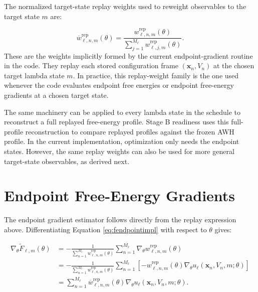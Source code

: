 The normalized target-state replay weights used to reweight observables to the target state $m$ are:

\begin{equation}
    \overline{w}^{\mathrm{rep}}_{\ell,n,m}(\theta)
    =
    \frac{
        w^{\mathrm{rep}}_{\ell,n,m}(\theta)
    }{
        \sum_{j=1}^{M_\ell}
        w^{\mathrm{rep}}_{\ell,j,m}(\theta)
    }.
    \label{eq:omegam}
\end{equation}
%
These are the weights implicitly formed by the current endpoint-gradient routine in the code. They replay each stored configuration frame $(\mathbf{x}_n, V_n)$ at the chosen target lambda state $m$. In practice, this replay-weight family is the one used whenever the code evaluates endpoint free energies or endpoint free-energy gradients at a chosen target state.

The same machinery can be applied to every lambda state in the schedule to reconstruct a full replayed free-energy profile. Stage B readiness uses this full-profile reconstruction to compare replayed profiles against the frozen AWH profile. In the current implementation, optimization only needs the endpoint states. However, the same replay weights can also be used for more general target-state observables, as derived next.

\section{Endpoint Free-Energy Gradients}

The endpoint gradient estimator follows directly from the replay expression above. Differentiating Equation \eqref{eq:fendpointimpl} with respect to $\theta$ gives:

\begin{align}
    \nabla_\theta \widetilde{F}_{\ell,m}(\theta)
    &=
    -\frac{1}{
        \sum_{n=1}^{M_\ell} w^{\mathrm{rep}}_{\ell,n,m}(\theta)
    }
    \sum_{n=1}^{M_\ell}
    \nabla_\theta w^{\mathrm{rep}}_{\ell,n,m}(\theta)
    \nonumber \\
    &=
    -\frac{1}{
        \sum_{n=1}^{M_\ell} w^{\mathrm{rep}}_{\ell,n,m}(\theta)
    }
    \sum_{n=1}^{M_\ell}
    \left[
        -w^{\mathrm{rep}}_{\ell,n,m}(\theta)
        \nabla_\theta
        u_\ell(\mathbf{x}_n, V_n, m; \theta)
    \right]
    \nonumber \\
    &=
    \sum_{n=1}^{M_\ell}
    \overline{w}^{\mathrm{rep}}_{\ell,n,m}(\theta)
    \nabla_\theta
    u_\ell(\mathbf{x}_n, V_n, m; \theta).
    \label{eq:fgradred}
\end{align}

